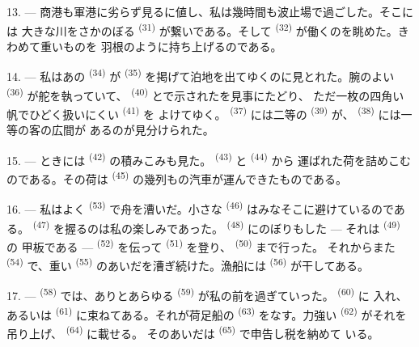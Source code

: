 13. --- 商港も軍港に劣らず見るに値し、私は幾時間も波止場で過ごした。そこには
大きな川をさかのぼる \textsuperscript{(31)} が繋いである。そして
 \textsuperscript{(32)} が働くのを眺めた。きわめて重いものを
羽根のように持ち上げるのである。

\VUsaut{4.0mm}
\VUsaut{3.0mm}

14. --- 私はあの \textsuperscript{(34)} が
\textsuperscript{(35)} を掲げて泊地を出てゆくのに見とれた。腕のよい
 \textsuperscript{(36)} が舵を執っていて、
\textsuperscript{(40)} とで示されたを見事にたどり、
ただ一枚の四角い帆でひどく扱いにくい \textsuperscript{(41)} を
よけてゆく。 \textsuperscript{(37)} には二等の
\textsuperscript{(39)} が、 \textsuperscript{(38)} には一等の客の広間が
あるのが見分けられた。

15. --- ときには \textsuperscript{(42)} の積みこみも見た。
 \textsuperscript{(43)} と \textsuperscript{(44)} から
運ばれた荷を詰めこむのである。その荷は \textsuperscript{(45)}
の幾列もの汽車が運んできたものである。

\VUsaut{3.0mm}
\VUsaut{3.0mm}

16. --- 私はよく \textsuperscript{(53)} で舟を漕いだ。小さな
 \textsuperscript{(46)} はみなそこに避けているのである。
\textsuperscript{(47)} を握るのは私の楽しみであった。
\textsuperscript{(48)} にのぼりもした --- それは \textsuperscript{(49)} の
甲板である ---  \textsuperscript{(52)} を伝って
\textsuperscript{(51)} を登り、 \textsuperscript{(50)} まで行った。
それからまた \textsuperscript{(54)} で、重い
\textsuperscript{(55)} のあいだを漕ぎ続けた。漁船には \textsuperscript{(56)}
が干してある。

17. ---  \textsuperscript{(58)} では、ありとあらゆる
\textsuperscript{(59)} が私の前を過ぎていった。 \textsuperscript{(60)} に
入れ、あるいは \textsuperscript{(61)} に束ねてある。それが荷足船の
 \textsuperscript{(63)} をなす。力強い
\textsuperscript{(62)} がそれを吊り上げ、 \textsuperscript{(64)} に載せる。
そのあいだは \textsuperscript{(65)} で申告し税を納めて
いる。

